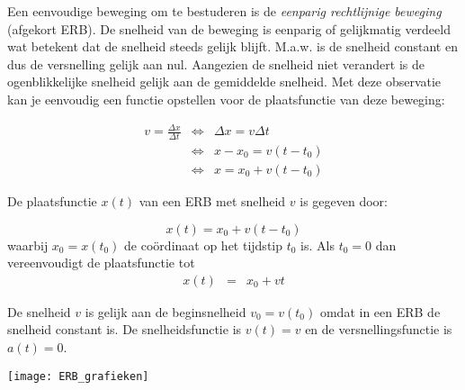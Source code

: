 \documentclass{ximera}
\begin{document}
	\author{Bart Lambregs}
    \xmsource




Een eenvoudige beweging om te bestuderen is de \emph{eenparig rechtlijnige beweging} (afgekort ERB). De snelheid van de beweging is eenparig of gelijkmatig verdeeld wat betekent dat de snelheid steeds gelijk blijft. M.a.w. is de snelheid constant en dus de versnelling gelijk aan nul. Aangezien de snelheid niet verandert is de ogenblikkelijke snelheid gelijk aan de gemiddelde snelheid. Met deze observatie kan je eenvoudig een functie opstellen voor de plaatsfunctie van deze beweging:

\[
\begin{array}{rcl}

v=\frac{\Delta x}{\Delta t} & \Leftrightarrow & \Delta x=v\Delta t \\
&\Leftrightarrow & x-x_0=v(t-t_0) \\
&\Leftrightarrow & x=x_0+v(t-t_0)

\end{array}
\]

\begin{theorem}
De plaatsfunctie $x(t)$ van een ERB met snelheid $v$ is gegeven door:

\[
x(t)=x_0+v(t-t_0)
\]
waarbij $x_0=x(t_0)$ de coördinaat op het tijdstip $t_0$ is. Als $t_0=0$ dan vereenvoudigt de plaatsfunctie tot
\begin{eqnarray}%
x(t)&=&x_0+vt
\end{eqnarray}

\end{theorem}

De snelheid $v$ is gelijk aan de beginsnelheid $v_0=v(t_0)$ omdat in een ERB de snelheid constant is. De snelheidsfunctie is $v(t)=v$ en de versnellingsfunctie is $a(t)=0$.

\begin{image}
\texttt{[image: ERB\_grafieken]}
\end{image}
\end{document}
